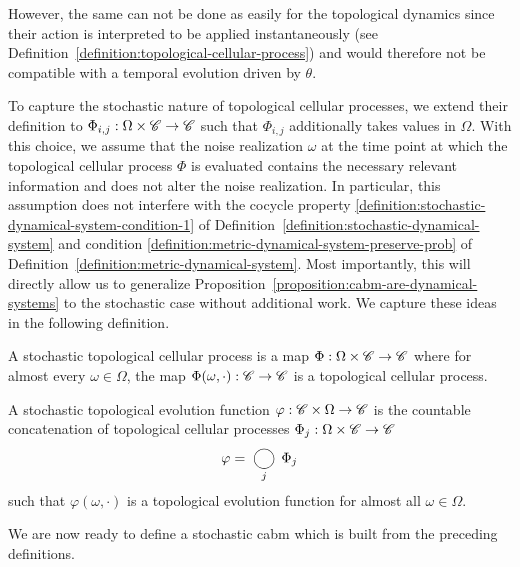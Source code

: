 However, the same can not be done as easily for the topological dynamics since their action is
interpreted to be applied instantaneously (see
Definition~\ref{definition:topological-cellular-process}) and would therefore not be compatible with
a temporal evolution driven by $\theta$.

To capture the stochastic nature of topological cellular processes, we extend their definition to
$\Phi_{i,j}:\Omega\times\mathscr{C}\rightarrow\mathscr{C}$ such that $\Phi_{i,j}$ additionally takes values in
$\Omega$.
With this choice, we assume that the noise realization $\omega$ at the time point at which the
topological cellular process $\Phi$ is evaluated contains the necessary relevant information and
does not alter the noise realization.
In particular, this assumption does not interfere with the cocycle property
\eqref{definition:stochastic-dynamical-system-condition-1} of
Definition~\ref{definition:stochastic-dynamical-system} and
condition \eqref{definition:metric-dynamical-system-preserve-prob} of
Definition~\ref{definition:metric-dynamical-system}.
Most importantly, this will directly allow us to generalize
Proposition~\ref{proposition:cabm-are-dynamical-systems} to the stochastic case without additional
work.
We capture these ideas in the following definition.

\begin{definition}
    A stochastic topological cellular process is a map
    $\Phi:\Omega\times\mathscr{C}\rightarrow\mathscr{C}$ where for almost every $\omega\in\Omega$, the map
    $\Phi(\omega,\cdot):\mathscr{C}\rightarrow\mathscr{C}$ is a topological cellular process.

    A stochastic topological evolution function $\varphi:\mathscr{C}\times\Omega\rightarrow\mathscr{C}$
    is the countable concatenation of topological cellular processes
    $\Phi_j:\Omega\times\mathscr{C}\rightarrow\mathscr{C}$
    \begin{equation}
        \varphi = \bigcomp_j\Phi_j
    \end{equation}
    such that $\varphi(\omega,\cdot)$ is a topological evolution function for almost all
    $\omega\in\Omega$.
\end{definition}

We are now ready to define a stochastic \ac{cabm} which is built from the preceding definitions.

